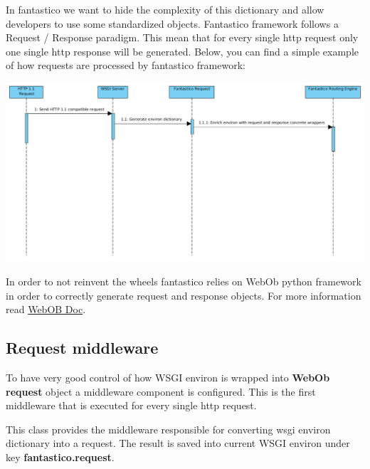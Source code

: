 \documentclass[letterpaper,10pt,english]{sphinxmanual}
\begin{document}
In fantastico we want to hide the complexity of this dictionary and allow developers to use some standardized objects. Fantastico
framework follows a Request / Response paradigm. This mean that for every single http request only one single http response will
be generated. Below, you can find a simple example of how requests are processed by fantastico framework:

\includegraphics{request_response_sd.png}

In order to not reinvent the wheels fantastico relies on WebOb python framework in order to correctly generate request and
response objects. For more information read \href{http://docs.webob.org/en/latest/reference.html}{WebOB Doc}.


\subsection{Request middleware}
\label{features/request_response:request-middleware}
To have very good control of how WSGI environ is wrapped into \textbf{WebOb request} object a middleware component is configured. This
is the first middleware that is executed for every single http request.

\begin{fulllineitems}
\label{features/request_response:fantastico.middleware.request_middleware.RequestMiddleware}
This class provides the middleware responsible for converting wsgi environ dictionary into a request. The result is saved
into current WSGI environ under key \textbf{fantastico.request}.

\end{fulllineitems}
\end{document}
